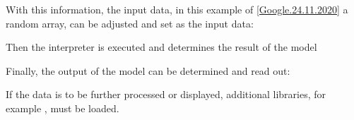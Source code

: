 \medskip


With this information, the input data, in this example of \ref{Google.24.11.2020} a random array, can be adjusted and set as the input data:

\medskip




\medskip

Then the interpreter is executed and determines the result of the model

\medskip



\medskip

Finally, the output of the model can be determined and read out:

\medskip


\medskip

If the data is to be further processed or displayed, additional libraries, for example , must be loaded.


